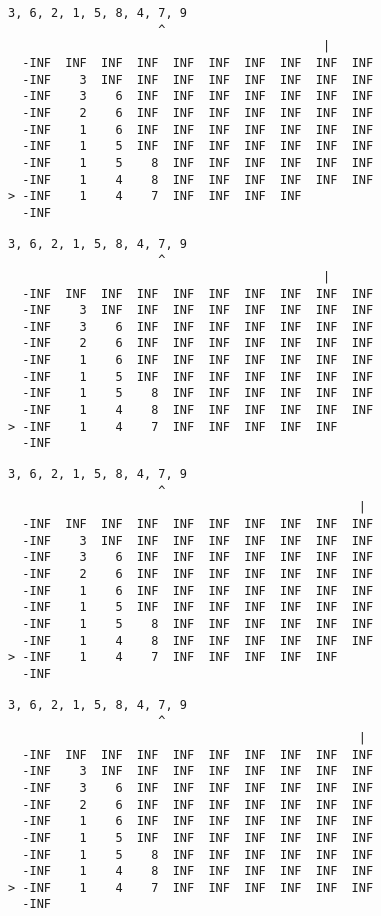 { \begin{verbatim}
3, 6, 2, 1, 5, 8, 4, 7, 9
                     ^
                                            |
  -INF  INF  INF  INF  INF  INF  INF  INF  INF  INF
  -INF    3  INF  INF  INF  INF  INF  INF  INF  INF
  -INF    3    6  INF  INF  INF  INF  INF  INF  INF
  -INF    2    6  INF  INF  INF  INF  INF  INF  INF
  -INF    1    6  INF  INF  INF  INF  INF  INF  INF
  -INF    1    5  INF  INF  INF  INF  INF  INF  INF
  -INF    1    5    8  INF  INF  INF  INF  INF  INF
  -INF    1    4    8  INF  INF  INF  INF  INF  INF
> -INF    1    4    7  INF  INF  INF  INF          
  -INF                                             
\end{verbatim} }

{ \begin{verbatim}
3, 6, 2, 1, 5, 8, 4, 7, 9
                     ^
                                            |
  -INF  INF  INF  INF  INF  INF  INF  INF  INF  INF
  -INF    3  INF  INF  INF  INF  INF  INF  INF  INF
  -INF    3    6  INF  INF  INF  INF  INF  INF  INF
  -INF    2    6  INF  INF  INF  INF  INF  INF  INF
  -INF    1    6  INF  INF  INF  INF  INF  INF  INF
  -INF    1    5  INF  INF  INF  INF  INF  INF  INF
  -INF    1    5    8  INF  INF  INF  INF  INF  INF
  -INF    1    4    8  INF  INF  INF  INF  INF  INF
> -INF    1    4    7  INF  INF  INF  INF  INF     
  -INF                                             
\end{verbatim} }

{ \begin{verbatim}
3, 6, 2, 1, 5, 8, 4, 7, 9
                     ^
                                                 |
  -INF  INF  INF  INF  INF  INF  INF  INF  INF  INF
  -INF    3  INF  INF  INF  INF  INF  INF  INF  INF
  -INF    3    6  INF  INF  INF  INF  INF  INF  INF
  -INF    2    6  INF  INF  INF  INF  INF  INF  INF
  -INF    1    6  INF  INF  INF  INF  INF  INF  INF
  -INF    1    5  INF  INF  INF  INF  INF  INF  INF
  -INF    1    5    8  INF  INF  INF  INF  INF  INF
  -INF    1    4    8  INF  INF  INF  INF  INF  INF
> -INF    1    4    7  INF  INF  INF  INF  INF     
  -INF                                             
\end{verbatim} }

{ \begin{verbatim}
3, 6, 2, 1, 5, 8, 4, 7, 9
                     ^
                                                 |
  -INF  INF  INF  INF  INF  INF  INF  INF  INF  INF
  -INF    3  INF  INF  INF  INF  INF  INF  INF  INF
  -INF    3    6  INF  INF  INF  INF  INF  INF  INF
  -INF    2    6  INF  INF  INF  INF  INF  INF  INF
  -INF    1    6  INF  INF  INF  INF  INF  INF  INF
  -INF    1    5  INF  INF  INF  INF  INF  INF  INF
  -INF    1    5    8  INF  INF  INF  INF  INF  INF
  -INF    1    4    8  INF  INF  INF  INF  INF  INF
> -INF    1    4    7  INF  INF  INF  INF  INF  INF
  -INF                                             
\end{verbatim} }

